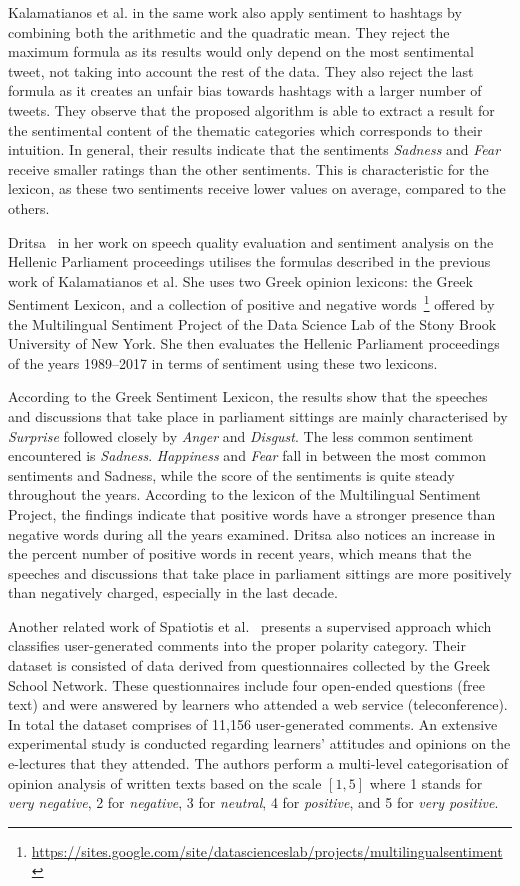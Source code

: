 Kalamatianos et al. in the same work also apply sentiment to hashtags
by combining both the arithmetic and the quadratic mean.
They reject the maximum formula as its results would only depend
on the most sentimental tweet, not taking into account the rest of the data.
They also reject the last formula as it creates an unfair bias towards hashtags
with a larger number of tweets.
They observe that the proposed algorithm is able to extract a result
for the sentimental content of the thematic categories
which corresponds to their intuition.
In general, their results indicate that the sentiments \emph{Sadness}
and \emph{Fear} receive smaller ratings than the other sentiments.
This is characteristic for the lexicon,
as these two sentiments receive lower values on average, compared to the others.

Dritsa~\cite{Dri18} in her work
on speech quality evaluation and sentiment analysis
on the Hellenic Parliament proceedings utilises the formulas
described in the previous work of Kalamatianos et al.
She uses two Greek opinion lexicons: the Greek Sentiment Lexicon,
and a collection of positive and negative words~\footnote{\url{https://sites.google.com/site/datascienceslab/projects/multilingualsentiment}}
offered by the Multilingual Sentiment Project of the Data Science Lab
of the Stony Brook University of New York.
She then evaluates the Hellenic Parliament proceedings of the years 1989--2017
in terms of sentiment using these two lexicons.

According to the Greek Sentiment Lexicon,
the results show that the speeches and discussions
that take place in parliament sittings are mainly characterised
by \emph{Surprise} followed closely by \emph{Anger} and \emph{Disgust}.
The less common sentiment encountered is \emph{Sadness}.
\emph{Happiness} and \emph{Fear} fall in
between the most common sentiments and Sadness,
while the score of the sentiments is quite steady throughout the years.
According to the lexicon of the Multilingual Sentiment Project,
the findings indicate that positive words have a stronger presence
than negative words during all the years examined.
Dritsa also notices an increase in the percent number of positive words
in recent years,
which means that the speeches and discussions that take place in parliament sittings
are more positively than negatively charged, especially in the last decade.

Another related work of Spatiotis et al.~\cite{SMPP16} presents a supervised approach
which classifies user-generated comments into the proper polarity category.
Their dataset is consisted of data derived from questionnaires
collected by the Greek School Network.
These questionnaires include four open-ended questions (free text)
and were answered by learners who attended a web service (teleconference).
In total the dataset comprises of 11,156 user-generated comments.
An extensive experimental study is conducted regarding learners' attitudes and opinions
on the e-lectures that they attended.
The authors perform a multi-level categorisation of opinion analysis of written texts
based on the scale $[1,5]$ where 1 stands for \emph{very negative},
2 for \emph{negative}, 3 for \emph{neutral}, 4 for \emph{positive},
and 5 for \emph{very positive}.

